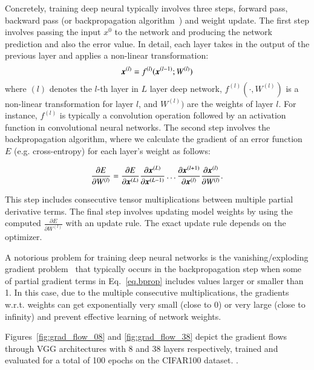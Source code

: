 \documentclass{article}
\begin{document}
Concretely, training deep neural typically involves three steps, forward
pass, backward pass (or backpropagation algorithm~\cite{rumelhart1986learning}) and weight update.
The first step involves passing the input $x^0$ to the network and producing 
the network prediction and also the error value.
In detail, each layer takes in the output of the previous layer and applies
a non-linear transformation:
\begin{equation}
\label{eq.fprop}
\bm{x}^{(l)} = f^{(l)}(\bm{x}^{(l-1)}; W^{(l)})    
\end{equation} 
where $(l)$ denotes the $l$-th layer in $L$ layer deep network,
$f^{(l)}(\cdot,W^{(l)})$ is 
a non-linear transformation for layer $l$, and $W^{(l)})$ are the 
weights of layer $l$.
For instance, $f^{(l)}$ is typically a convolution operation followed by an activation
function in convolutional neural networks.
The second step involves the backpropagation algorithm, where we calculate
the gradient of an error function $E$ (e.g. cross-entropy) for each layer's
weight as follows:

\begin{equation}
    \label{eq.bprop}
\frac{\partial E}{\partial W^{(l)}} = \frac{\partial E}{\partial \bm{x}^{(L)}} \frac{\partial \bm{x}^{(L)}}{\partial \bm{x}^{(L-1)}} \dots \frac{\partial \bm{x}^{(l+1)}}{\partial \bm{x}^{(l)}}\frac{\partial \bm{x}^{(l)}}{\partial W^{(l)}}.
\end{equation}

This step includes consecutive tensor multiplications between multiple
partial derivative terms.
The final step involves updating model weights by using the computed 
$\frac{\partial E}{\partial W^{(l)}}$ with an update rule.
The exact update rule depends on the optimizer.

A notorious problem for training deep neural networks is the vanishing/exploding gradient
problem~\cite{bengio1993problem} that typically occurs in the backpropagation step when some of partial gradient terms in Eq.~\ref{eq.bprop} includes values larger or smaller than 1.
In this case, due to the multiple consecutive multiplications, the gradients w.r.t. weights
can get exponentially very small (close to 0) or very large (close to infinity) and
prevent effective learning of network weights.


%


Figures~\ref{fig:grad_flow_08} and \ref{fig:grad_flow_38} depict the gradient flows through
VGG architectures \cite{simonyan2014very} with 8 and 38 layers respectively,
trained and evaluated for a total of 100 epochs on the 
CIFAR100 dataset. \questionOne.
\end{document}
